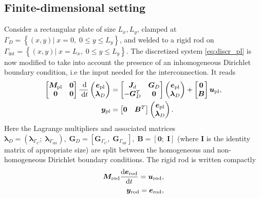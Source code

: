 \documentclass[letterpaper, 10 pt, conference]{ieeeconf}
\begin{document}
\subsection{Finite-dimensional setting}
Consider a rectangular plate of size $L_x, L_y$, clamped at $\Gamma_{D} = \left\{(x,y) \vert \;  x=0, \; 0 \le y \le L_y  \right\}$, and welded to a rigid rod on $\Gamma_{\text{int}} = \left\{ (x,y) \vert \;  x=L_x, \; 0 \le y \le L_y  \right\}$. The discretized system \eqref{eq:discr_pl} is now modified to take into account the presence of an inhomogeneous Dirichlet boundary condition, i.e the input needed for the interconnection. It reads
\begin{equation}
\begin{aligned}
\begin{bmatrix}
\bm{M}_{\text{pl}} & \bm{0} \\
\bm{0} & \bm{0} \\
\end{bmatrix}\frac{\d}{\d t}
\begin{pmatrix}
\bm{e}_{\text{pl}}\\
\bm{\lambda}_D \\
\end{pmatrix}
&= \begin{bmatrix}
\bm{J}_d & \bm{G}_D \\
-\bm{G}_D^T & \bm{0} \\
\end{bmatrix}
\begin{pmatrix}
\bm{e}_{\text{pl}}\\
\bm{\lambda}_D \\
\end{pmatrix} + \begin{bmatrix}
\bm{0} \\
\bm{B} \\
\end{bmatrix} \bm{u}_{\text{pl}}, \\
\bm{y}_{\text{pl}} &= \begin{bmatrix}
\bm{0} & \bm{B}^T \\
\end{bmatrix} \begin{pmatrix}
\bm{e}_{\text{pl}}\\
\bm{\lambda}_D \\
\end{pmatrix}.
\end{aligned} 
\end{equation}
Here the Lagrange multipliers and associated matrices $\bm{\lambda}_D =  (\bm\lambda_{\Gamma_{C}}; \; \bm\lambda_{\Gamma_{\text{int}}} ), \; \bm{G}_D = [\bm{G}_{\Gamma_{C}}, \; \bm{G}_{\Gamma_{\text{int}}}], \; \bm{B} = [\bm{0}; \; \bm{I}]$ (where $\bm{I}$ is the identity matrix of appropriate size) are split between the homogeneous and non-homogeneous Dirichlet boundary conditions. The rigid rod is written compactly 
\begin{equation}
\begin{aligned}
\bm{M}_{\text{rod}} \diff{\bm{e}_{\text{rod}}}{t} = \bm{u}_{\text{rod}}, \\
\bm{y}_{\text{rod}} = \bm{e}_{\text{rod}},
\end{aligned}
\end{equation}
\end{document}

